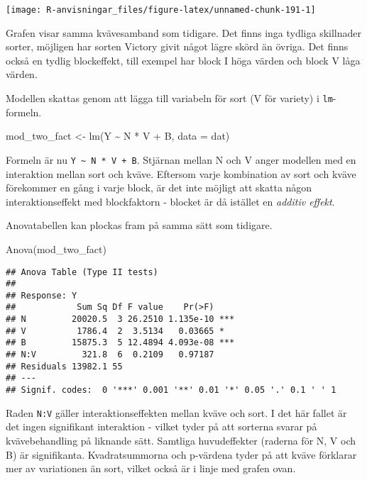 \documentclass[
]{book}
\newenvironment{Shaded}{\begin{snugshade}}{\end{snugshade}}
\newcommand{\AttributeTok}[1]{\textcolor[rgb]{0.77,0.63,0.00}{#1}}
\newcommand{\FunctionTok}[1]{\textcolor[rgb]{0.00,0.00,0.00}{#1}}
\newcommand{\NormalTok}[1]{#1}
\newcommand{\OtherTok}[1]{\textcolor[rgb]{0.56,0.35,0.01}{#1}}
\newcommand{\SpecialCharTok}[1]{\textcolor[rgb]{0.00,0.00,0.00}{#1}}
\theoremstyle{definition}
\theoremstyle{definition}
\theoremstyle{definition}
\theoremstyle{definition}
\theoremstyle{remark}
\begin{document}
\begin{center}\texttt{[image: R-anvisningar\_files/figure-latex/unnamed-chunk-191-1]} \end{center}

Grafen visar samma kvävesamband som tidigare. Det finns inga tydliga skillnader sorter, möjligen har sorten Victory givit något lägre skörd än övriga. Det finns också en tydlig blockeffekt, till exempel har block I höga värden och block V låga värden.

Modellen skattas genom att lägga till variabeln för sort (V för variety) i \texttt{lm}-formeln.

\begin{Shaded}
\begin{Highlighting}[]
\NormalTok{mod\_two\_fact }\OtherTok{\textless{}{-}} \FunctionTok{lm}\NormalTok{(Y }\SpecialCharTok{\textasciitilde{}}\NormalTok{ N }\SpecialCharTok{*}\NormalTok{ V }\SpecialCharTok{+}\NormalTok{ B, }\AttributeTok{data =}\NormalTok{ dat)}
\end{Highlighting}
\end{Shaded}

Formeln är nu \texttt{Y\ \textasciitilde{}\ N\ *\ V\ +\ B}. Stjärnan mellan N och V anger modellen med en interaktion mellan sort och kväve. Eftersom varje kombination av sort och kväve förekommer en gång i varje block, är det inte möjligt att skatta någon interaktionseffekt med blockfaktorn - blocket är då istället en \emph{additiv effekt}.

Anovatabellen kan plockas fram på samma sätt som tidigare.

\begin{Shaded}
\begin{Highlighting}[]
\FunctionTok{Anova}\NormalTok{(mod\_two\_fact)}
\end{Highlighting}
\end{Shaded}

\begin{verbatim}
## Anova Table (Type II tests)
## 
## Response: Y
##            Sum Sq Df F value    Pr(>F)    
## N         20020.5  3 26.2510 1.135e-10 ***
## V          1786.4  2  3.5134   0.03665 *  
## B         15875.3  5 12.4894 4.093e-08 ***
## N:V         321.8  6  0.2109   0.97187    
## Residuals 13982.1 55                      
## ---
## Signif. codes:  0 '***' 0.001 '**' 0.01 '*' 0.05 '.' 0.1 ' ' 1
\end{verbatim}

Raden \texttt{N:V} gäller interaktionseffekten mellan kväve och sort. I det här fallet är det ingen signifikant interaktion - vilket tyder på att sorterna svarar på kvävebehandling på liknande sätt. Samtliga huvudeffekter (raderna för N, V och B) är signifikanta. Kvadratsummorna och p-värdena tyder på att kväve förklarar mer av variationen än sort, vilket också är i linje med grafen ovan.
\end{document}
